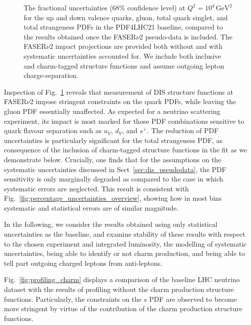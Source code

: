 \begin{figure}[t]
\caption{
The fractional uncertainties (68\% confidence level) at $Q^2 = 10^4 \, \textrm{GeV}^2$ 
for the up and down valence quarks, gluon, total quark singlet, and total strangeness PDFs
in the PDF4LHC21 baseline, compared to the results obtained once the FASER$\nu$2 pseudo-data is included.
%
The FASER$\nu$2 impact projections are provided both without and with systematic
uncertainties accounted for.
%
We include  both  inclusive and charm-tagged structure functions
and assume outgoing lepton charge-separation.
%
}
\label{fig:FASERnu2_baseline}
\end{figure}

Inspection of Fig.~\ref{fig:FASERnu2_baseline} reveals that measurement of DIS structure
functions at FASER$\nu$2 impose stringent constraints on the quark PDFs, while leaving
the gluon PDF essentially unaffected.
%
As expected for a neutrino scattering experiment, its impact is most marked for
those PDF combinations sensitive to quark flavour separation such as $u_V$, $d_V$, and
$s^+$.
%
The reduction of PDF uncertainties is particularly significant for the total strangeness PDF,
as  consequence of the inclusion of charm-tagged structure functions in the fit as we demonstrate below.
%
Crucially, one finds that for the assumptions on the systematic uncertainties
discussed in Sect~\ref{sec:dis_pseudodata}, the PDF sensitivity is only marginally degraded
as compared to the case in which systematic errors are neglected.
%
This result is consistent with Fig.~\ref{fig:percentage_uncertainties_overview}, showing
how in most bins systematic and statistical errors are of similar magnitude.

In the following, we consider the results obtained using only statistical uncertainties as the baseline, 
and examine stability of these results with respect to the chosen experiment and integrated luminosity, the modelling of systematic
uncertainties, being able to identify or not charm production, and being able to tell part outgoing
charged leptons from anti-leptons.


%
Fig.~\ref{fig:profiling_charm} displays a comparison of the baseline LHC neutrino dataset with the results
of profiling without the charm production structure functions. 
Particularly, the constraints on the $s$ PDF are observed to become more stringent 
by virtue of the contribution of the charm production structure functions.

